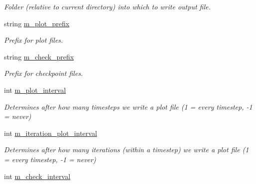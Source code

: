 \begin{DoxyCompactItemize}
\begin{DoxyCompactList}\small\item\em Folder (relative to current directory) into which to write output file. \end{DoxyCompactList}\item 
\hypertarget{classamr_mushy_layer_a4ad75305195e041a1cb29f72a019f217}{string \hyperlink{classamr_mushy_layer_a4ad75305195e041a1cb29f72a019f217}{m\-\_\-plot\-\_\-prefix}}\label{classamr_mushy_layer_a4ad75305195e041a1cb29f72a019f217}

\begin{DoxyCompactList}\small\item\em Prefix for plot files. \end{DoxyCompactList}\item 
\hypertarget{classamr_mushy_layer_a61641edb4434e9da02836eb41b205d10}{string \hyperlink{classamr_mushy_layer_a61641edb4434e9da02836eb41b205d10}{m\-\_\-check\-\_\-prefix}}\label{classamr_mushy_layer_a61641edb4434e9da02836eb41b205d10}

\begin{DoxyCompactList}\small\item\em Prefix for checkpoint files. \end{DoxyCompactList}\item 
\hypertarget{classamr_mushy_layer_a0c49443f126b1b3dd66cf19c37fc55de}{int \hyperlink{classamr_mushy_layer_a0c49443f126b1b3dd66cf19c37fc55de}{m\-\_\-plot\-\_\-interval}}\label{classamr_mushy_layer_a0c49443f126b1b3dd66cf19c37fc55de}

\begin{DoxyCompactList}\small\item\em Determines after how many timesteps we write a plot file (1 = every timestep, -\/1 = never) \end{DoxyCompactList}\item 
\hypertarget{classamr_mushy_layer_a903770c308b932545c1f96091af9b8c1}{int \hyperlink{classamr_mushy_layer_a903770c308b932545c1f96091af9b8c1}{m\-\_\-iteration\-\_\-plot\-\_\-interval}}\label{classamr_mushy_layer_a903770c308b932545c1f96091af9b8c1}

\begin{DoxyCompactList}\small\item\em Determines after how many iterations (within a timestep) we write a plot file (1 = every timestep, -\/1 = never) \end{DoxyCompactList}\item 
\hypertarget{classamr_mushy_layer_ab3794560d5dc3d0fda50a368f3733496}{int \hyperlink{classamr_mushy_layer_ab3794560d5dc3d0fda50a368f3733496}{m\-\_\-check\-\_\-interval}}\label{classamr_mushy_layer_ab3794560d5dc3d0fda50a368f3733496}


\end{DoxyCompactItemize}
